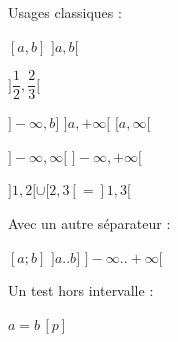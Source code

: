 \documentclass[varwidth, border = 3pt]{standalone}
\begin{document}
Usages classiques :

$[a, b]$
\quad
$]a, b[$

$]\dfrac{1}{2}, \dfrac{2}{3}[$

$]-\infty, b]$
\quad
$]a, +\infty[$
\quad
$[a, \infty[$

$]-\infty, \infty[$
\quad
$]-\infty, +\infty[$

$]1, 2[ \cup [2, 3[ = ]1, 3[$


\medskip


Avec un autre séparateur :

$[a ; b]$
\quad
$]a .. b]$
\quad
$]-\infty .. +\infty[$


\medskip


Un test hors intervalle : 

$a = b \, [p]$
\end{document}
